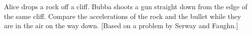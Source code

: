  Alice drops a rock off a cliff. Bubba shoots a gun
straight down from the edge of the same cliff. Compare the
accelerations of the rock and the bullet while they are in the air on
the way down. [Based on a problem by Serway and Faughn.]
